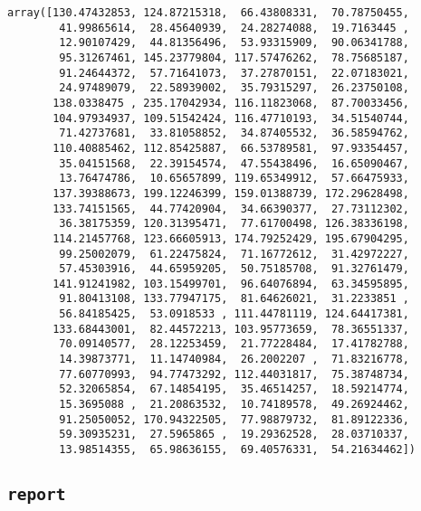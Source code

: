 \documentclass[11pt]{article}
\makeatletter
\newcommand{\boxspacing}{\kern\kvtcb@left@rule\kern\kvtcb@boxsep}
\newcommand{\prompt}[4]{
        \ttfamily\llap{{\color{#2}[#3]:\hspace{3pt}#4}}\vspace{-\baselineskip}
    }
\makeatother
\begin{document}
            \begin{tcolorbox}[breakable, size=fbox, boxrule=.5pt, pad at break*=1mm, opacityfill=0]
\prompt{Out}{outcolor}{24}{\boxspacing}
\begin{Verbatim}[commandchars=\\\{\}]
array([130.47432853, 124.87215318,  66.43808331,  70.78750455,
        41.99865614,  28.45640939,  24.28274088,  19.7163445 ,
        12.90107429,  44.81356496,  53.93315909,  90.06341788,
        95.31267461, 145.23779804, 117.57476262,  78.75685187,
        91.24644372,  57.71641073,  37.27870151,  22.07183021,
        24.97489079,  22.58939002,  35.79315297,  26.23750108,
       138.0338475 , 235.17042934, 116.11823068,  87.70033456,
       104.97934937, 109.51542424, 116.47710193,  34.51540744,
        71.42737681,  33.81058852,  34.87405532,  36.58594762,
       110.40885462, 112.85425887,  66.53789581,  97.93354457,
        35.04151568,  22.39154574,  47.55438496,  16.65090467,
        13.76474786,  10.65657899, 119.65349912,  57.66475933,
       137.39388673, 199.12246399, 159.01388739, 172.29628498,
       133.74151565,  44.77420904,  34.66390377,  27.73112302,
        36.38175359, 120.31395471,  77.61700498, 126.38336198,
       114.21457768, 123.66605913, 174.79252429, 195.67904295,
        99.25002079,  61.22475824,  71.16772612,  31.42972227,
        57.45303916,  44.65959205,  50.75185708,  91.32761479,
       141.91241982, 103.15499701,  96.64076894,  63.34595895,
        91.80413108, 133.77947175,  81.64626021,  31.2233851 ,
        56.84185425,  53.0918533 , 111.44781119, 124.64417381,
       133.68443001,  82.44572213, 103.95773659,  78.36551337,
        70.09140577,  28.12253459,  21.77228484,  17.41782788,
        14.39873771,  11.14740984,  26.2002207 ,  71.83216778,
        77.60770993,  94.77473292, 112.44031817,  75.38748734,
        52.32065854,  67.14854195,  35.46514257,  18.59214774,
        15.3695088 ,  21.20863532,  10.74189578,  49.26924462,
        91.25050052, 170.94322505,  77.98879732,  81.89122336,
        59.30935231,  27.5965865 ,  19.29362528,  28.03710337,
        13.98514355,  65.98636155,  69.40576331,  54.21634462])
\end{Verbatim}
\end{tcolorbox}
        
    \hypertarget{report}{%
\subsection{\texorpdfstring{\texttt{report}}{report}}\label{report}}
\end{document}
